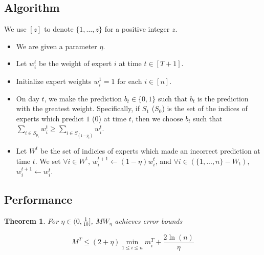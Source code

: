 \documentclass[11pt]{article}
\newtheorem{theorem}{Theorem}
\begin{document}
\subsection{Algorithm}

We use $[z]$ to denote $\{1,\ldots,z\}$ for a positive integer $z$.

\begin{itemize}

\item We are given a parameter $\eta$. 

\item Let $w_i^t$ be the weight of expert $i$ at time $t \in [T+1]$.

\item Initialize expert weights $w_i^1 =1$ for each $i \in [n]$.

\item On day $t$, we make the prediction $b_t \in \{0,1\}$ such that $b_t$ is the prediction with the greatest weight. Specifically, if $S_1$ ($S_0$) is the set of the indices of experts which predict $1$ ($0$) at time $t$, then we choose $b_t$ such that $\sum_{i \in S_{p_t}} w_{i}^t \geq \sum_{i \in S_{(1-p_t)}} w_{i}^t$. 

\item Let $W^t$ be the set of indicies of experts which made an incorrect prediction at time $t$. We set $\forall i \in W^t$, $w_i^{t+1} \leftarrow (1-\eta) w_i^t$, and $\forall i \in (\{1,...,n\}-W_t)$, $w_i^{t+1} \leftarrow w_i^t$. 

\end{itemize}

\subsection{Performance}

\begin{theorem} For $\eta \in (0,\frac{1}{10}]$, $MW_{\eta}$ achieves error bounds 

$$M^{T} \leq (2+\eta) \min_{1 \leq i \leq n} m_{i}^{T} +\frac{2 \ln(n)}{\eta}$$

\end{theorem}
 

\
\end{document}
